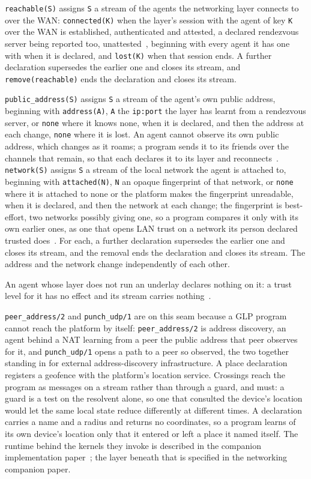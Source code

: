 \verb|reachable(S)| assigns \verb|S| a stream of the agents the networking layer connects to over the WAN: \verb|connected(K)| when the layer's session with the agent of key \verb|K| over the WAN is established, authenticated and attested, a declared rendezvous server being reported too, unattested~\cite{bachar2026networking}, beginning with every agent it has one with when it is declared, and \verb|lost(K)| when that session ends.  A further declaration supersedes the earlier one and closes its stream, and \verb|remove(reachable)| ends the declaration and closes its stream.

\verb|public_address(S)| assigns \verb|S| a stream of the agent's own public address, beginning with \verb|address(A)|, \verb|A| the \verb|ip:port| the layer has learnt from a rendezvous server, or \verb|none| where it knows none, when it is declared, and then the address at each change, \verb|none| where it is lost.  An agent cannot observe its own public address, which changes as it roams; a program sends it to its friends over the channels that remain, so that each declares it to its layer and reconnects~\cite{bachar2026networking}.  \verb|network(S)| assigns \verb|S| a stream of the local network the agent is attached to, beginning with \verb|attached(N)|, \verb|N| an opaque fingerprint of that network, or \verb|none| where it is attached to none or the platform makes the fingerprint unreadable, when it is declared, and then the network at each change; the fingerprint is best-effort, two networks possibly giving one, so a program compares it only with its own earlier ones, as one that opens LAN trust on a network its person declared trusted does~\cite{bachar2026networking}.  For each, a further declaration supersedes the earlier one and closes its stream, and the removal ends the declaration and closes its stream.  The address and the network change independently of each other.

An agent whose layer does not run an underlay declares nothing on it: a trust level for it has no effect and its stream carries nothing~\cite{bachar2026networking}.

\verb|peer_address/2| and \verb|punch_udp/1| are on this seam because a GLP program cannot reach the platform by itself: \verb|peer_address/2| is address discovery, an agent behind a NAT learning from a peer the public address that peer observes for it, and \verb|punch_udp/1| opens a path to a peer so observed, the two together standing in for external address-discovery infrastructure. A place declaration registers a geofence with the platform's location service. Crossings reach the program as messages on a stream rather than through a guard, and must: a guard is a test on the resolvent alone, so one that consulted the device's location would let the same local state reduce differently at different times. A declaration carries a name and a radius and returns no coordinates, so a program learns of its own device's location only that it entered or left a place it named itself. The runtime behind the kernels they invoke is described in the companion implementation paper~\cite{shapiro2026implementing}; the layer beneath that is specified in the networking companion paper.

